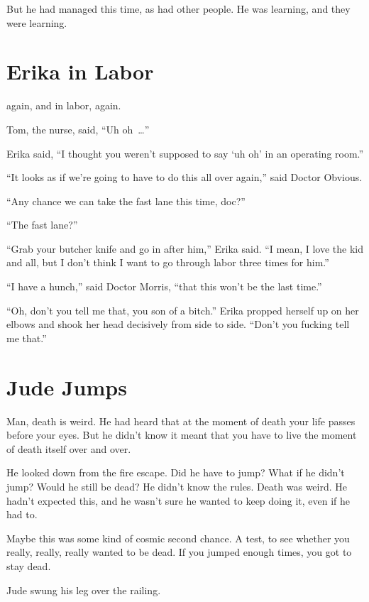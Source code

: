 But he had managed this time, as had other people. He was learning, and they were learning.



\chapter{Erika in Labor}

 again, and in labor, again.

Tom, the nurse, said, “Uh oh~…”

Erika said, “I thought you weren’t supposed to say ‘uh oh’ in an operating room.”

“It looks as if we’re going to have to do this all over again,” said Doctor Obvious.

“Any chance we can take the fast lane this time, doc?”

“The fast lane?”

“Grab your butcher knife and go in after him,” Erika said. “I mean, I love the kid and all, but I don’t think I want to go through labor three times for him.”

“I have a hunch,” said Doctor Morris, “that this won’t be the last time.”

“Oh, don’t you tell me that, you son of a bitch.” Erika propped herself up on her elbows and shook her head decisively from side to side. “Don’t you fucking tell me that.”



\chapter{Jude Jumps}

 Man, death is weird. He had heard that at the moment of death your life passes before your eyes. But he didn’t know it meant that you have to live the moment of death itself over and over.

He looked down from the fire escape. Did he have to jump? What if he didn’t jump? Would he still be dead? He didn’t know the rules. Death was weird. He hadn’t expected this, and he wasn’t sure he wanted to keep doing it, even if he had to.

Maybe this was some kind of cosmic second chance. A test, to see whether you really, really, really wanted to be dead. If you jumped enough times, you got to stay dead.

Jude swung his leg over the railing.

